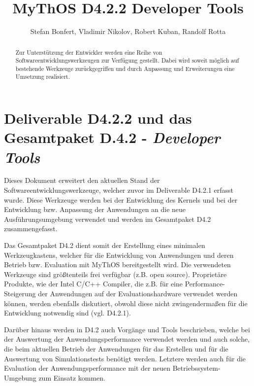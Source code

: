 

\title{MyThOS D4.2.2 Developer Tools}
\author{Stefan Bonfert, Vladimir Nikolov, Robert Kuban, Randolf Rotta}



\maketitle

\begin{abstract}

Zur Unterstützung der Entwickler werden eine Reihe von
Softwareentwicklungswerkzeugen zur Verfügung gestellt. Dabei wird soweit möglich
auf bestehende Werkzeuge zurückgegriffen und durch Anpassung und Erweiterungen
eine Umsetzung realisiert.

\end{abstract}

\newpage
\tableofcontents
\newpage

\section{Deliverable D4.2.2 und das Gesamtpaket D.4.2 - \emph{Developer Tools}}

Dieses Dokument erweitert den aktuellen Stand der Softwareentwicklungswerkzeuge,
welcher zuvor im Deliverable D4.2.1 erfasst wurde.
Diese Werkzeuge werden bei der Entwicklung des Kernels und bei der Entwicklung
bzw. Anpassung der Anwendungen an die neue Ausführungsumgebung verwendet und
werden im Gesamtpaket D4.2 zusammengefasst.

Das Gesamtpaket D4.2 dient somit der Erstellung eines minimalen Werkzeugkastens,
welcher für die Entwicklung von Anwendungen und deren Betrieb bzw. Evaluation
mit MyThOS bereitgestellt wird. Die verwendeten Werkzeuge sind größtenteils frei
verfügbar (z.B. open source). Proprietäre Produkte, wie der Intel C/C++
Compiler, die z.B. für eine Performance-Steigerung der Anwendungen auf der
Evaluationshardware verwendet werden können, werden ebenfalls diskutiert, obwohl
diese nicht zwingendermaßen für die Entwicklung notwendig sind (vgl. D4.2.1).

Darüber hinaus werden in D4.2 auch Vorgänge und Tools beschrieben, welche bei
der Auswertung der Anwendungsperformance verwendet werden und auch solche, die
beim aktuellen Betrieb der Anwendungen für das Erstellen und für die Auswertung
von Simulationstests benötigt werden. Letztere werden auch für die Evaluation
der Anwendungsperformance mit der neuen Betriebssystem-Umgebung zum Einsatz
kommen. 

